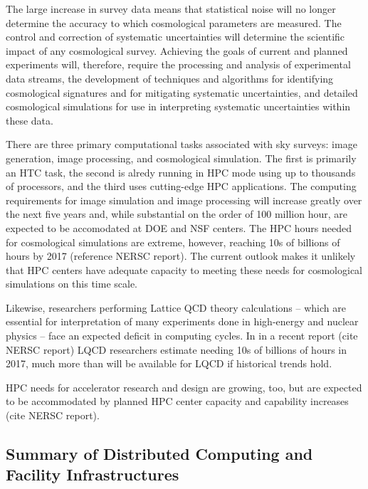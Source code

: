 The large increase in survey data means that statistical noise will no longer determine the accuracy to which cosmological parameters are 
measured. The control and correction of systematic uncertainties will determine the scientific impact of any cosmological survey. 
Achieving the goals of current and planned experiments will, therefore, require the processing and analysis of experimental data streams, 
the development of techniques and algorithms for identifying cosmological signatures and for mitigating systematic uncertainties, 
 and detailed cosmological simulations for use in interpreting systematic uncertainties within these data. 

There are three primary computational tasks associated with sky surveys: image generation, image processing, and cosmological simulation. The first 
is primarily an HTC task, the second is alredy running in HPC mode using up to thousands of processors, and the third uses cutting-edge HPC applications.  The computing requirements for image simulation and image processing will increase greatly over the next five years and, while substantial
on the order of 100 million hour, are expected to be accomodated at DOE and NSF centers. The HPC hours needed for cosmological simulations are extreme, however, reaching 10s of billions of hours by 2017 (reference NERSC report). The current outlook
makes it unlikely that HPC centers have adequate capacity to meeting these needs for cosmological
simulations on this time scale. 
 
Likewise, researchers performing Lattice QCD theory calculations 
-- which are essential for interpretation of many experiments done in high-energy and nuclear physics -- 
face an expected deficit in computing cycles. In in a recent report (cite NERSC report) 
LQCD researchers estimate needing 10s of billions of  hours in 2017, much more than will be available 
for LQCD if historical trends hold.

HPC needs for accelerator research and design are growing, too, but are expected to be accommodated by planned HPC center capacity and capability increases (cite NERSC report). 

\subsection{Summary of Distributed Computing and Facility Infrastructures}

